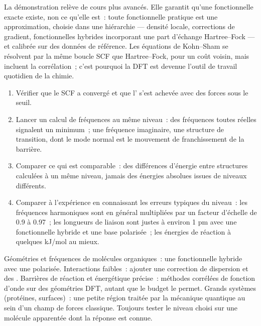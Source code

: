 La démonstration relève de cours plus avancés. Elle garantit qu'une
fonctionnelle exacte existe, non ce qu'elle est~: toute fonctionnelle
pratique est une approximation, choisie dans une hiérarchie --- densité
locale, corrections de gradient, fonctionnelles hybrides incorporant une
part d'échange Hartree--Fock --- et calibrée sur des données de
référence. Les équations de Kohn--Sham se résolvent par la même boucle
SCF que Hartree--Fock, pour un coût voisin, mais incluent la
corrélation~; c'est pourquoi la DFT est devenue l'outil de travail
quotidien de la chimie.

\begin{method}\label{met:b3:computational-chemistry:read-calculation}
\begin{enumerate}
  \item Vérifier que le SCF a convergé et que l'
        s'est achevée avec des forces sous le seuil.
  \item Lancer un calcul de fréquences au même niveau~: des fréquences
        toutes réelles signalent un minimum~; une fréquence imaginaire,
        une structure de transition, dont le mode normal est le
        mouvement de franchissement de la barrière.
  \item Comparer ce qui est comparable~: des différences d'énergie entre
        structures calculées à un même niveau, jamais des énergies
        absolues issues de niveaux différents.
  \item Comparer à l'expérience en connaissant les erreurs typiques du
        niveau~: les fréquences harmoniques sont en général multipliées
        par un facteur d'échelle de 0.9 à 0.97~;
        les longueurs de liaison sont justes à environ 1 pm avec une
        fonctionnelle hybride et une base polarisée~; les énergies de
        réaction à quelques \unit{kJ/mol} au mieux.
\end{enumerate}
\end{method}

\begin{method}\label{met:b3:computational-chemistry:choose-level}
Géométries et fréquences de molécules organiques~: une fonctionnelle
hybride avec une  polarisée. Interactions
faibles~: ajouter une correction de dispersion et des . Barrières de réaction et énergétique précise~: méthodes
corrélées de fonction d'onde sur des géométries DFT, autant que le
budget le permet. Grands systèmes (protéines, surfaces)~: une petite
région traitée par la mécanique quantique au sein d'un champ de forces
classique. Toujours tester le niveau choisi sur une molécule apparentée
dont la réponse est connue.
\end{method}

